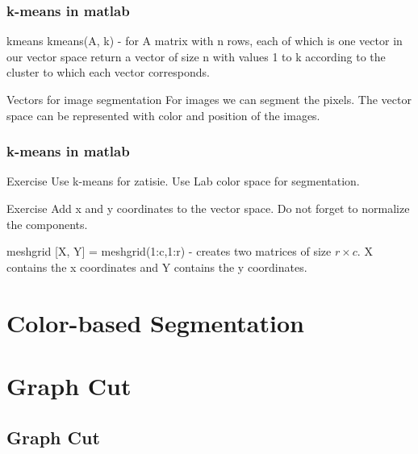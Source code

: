 \documentclass{beamer}
\begin{document}
\begin{frame}
\frametitle{k-means in matlab}
\begin{block}{kmeans}
kmeans(A, k) - for A matrix with n rows, each of which is one vector in our vector space return a vector of size n with values 1 to k according to the cluster to which each vector corresponds.
\end{block}

\begin{block}{Vectors for image segmentation}
For images we can segment the pixels. The vector space can be represented with color and position of the images.
\end{block}
\end{frame}

\begin{frame}
\frametitle{k-means in matlab}
\begin{block}{Exercise}
Use k-means for zatisie. Use Lab color space for segmentation.
\end{block}

\begin{block}{Exercise}
Add x and y coordinates to the vector space. Do not forget to normalize the components.
\end{block}


\begin{block}{meshgrid}
[X, Y] = meshgrid(1:c,1:r) - creates two matrices of size $r \times c$. X contains the x coordinates and Y contains the y coordinates.

\end{block}
\end{frame}

\section{Color-based Segmentation}

\section{Graph Cut}
\subsection{Graph Cut}
\end{document}
